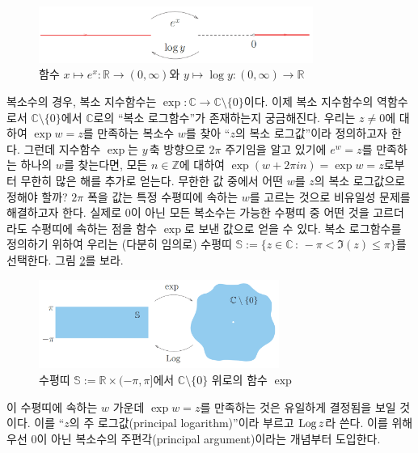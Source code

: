 \begin{figure}[!h]
\begin{center}
\includegraphics[width=0.8\textwidth]{./SaltChapter/figs/fig-1-18}
\end{center}
\caption{함수 $x\mapsto e^x : \mathbb R \to (0,\infty)$와
$y\mapsto \log y : (0,\infty) \to \mathbb R$}
\label{fig-1-18}
\end{figure}

복소수의 경우,
복소 지수함수는 $\exp: \mathbb C \to \mathbb C\setminus \{0\}$이다.
이제 복소 지수함수의 역함수로서 $\mathbb C\setminus \{0\}$에서 $\mathbb C$로의
``복소 로그함수''가 존재하는지 궁금해진다.
우리는 $z\ne0$에 대하여 $\exp w = z$를 만족하는 복소수 $w$를 찾아
``$z$의 복소 로그값''이라 정의하고자 한다.
그런데  지수함수 $\exp$는 $y\,$축 방향으로 $2\pi$ 주기임을 알고 있기에
$e^w =z$를 만족하는 하나의 $w$를 찾는다면,
모든 $n\in\mathbb Z$에 대하여 $\exp(w+2\pi i n) = \exp w = z$로부터
무한히 많은 해를 추가로 얻는다.
무한한 값 중에서 어떤 $w$를 $z$의 복소 로그값으로 정해야 할까?
$2\pi$ 폭을 값는 특정 수평띠에 속하는
$w$를 고르는 것으로 비유일성 문제를  해결하고자 한다.
실제로 $0$이 아닌 모든 복소수는 
가능한 수평띠 중 어떤 것을 고르더라도 
수평띠에 속하는 점을 함수 $\exp$로 보낸 값으로 얻을 수 있다.
복소 로그함수를 정의하기 위하여
우리는 (다분히 임의로) 수평띠 $\mathbb S := \{ z\in\mathbb C\,:\, -\pi < \Im(z) \le \pi\}$를
선택한다. 그림  \ref{fig-1-19}를 보라.

\begin{figure}[!h]
\begin{center}
\includegraphics[width=0.7\textwidth]{./SaltChapter/figs/fig-1-19}
\end{center}
\caption{수평띠 $\mathbb S := \mathbb R \times (-\pi, \pi]$에서
$\mathbb C\setminus \{0\}$ 위로의 함수 $\exp$}
\label{fig-1-19}
\end{figure}

이 수평띠에 속하는 $w$ 가운데 $\exp w = z$를 만족하는 것은
유일하게 결정됨을 보일 것이다. 
이를 ``$z$의 주 로그값(principal logarithm)''이라 부르고 $\mathop{\mathrm{Log}} z$라 쓴다.
이를 위해 우선 $0$이 아닌 복소수의 주편각(principal argument)이라는 개념부터 도입한다.

